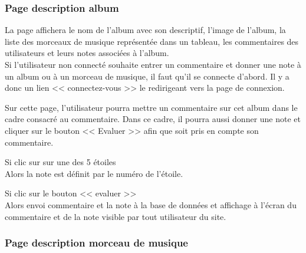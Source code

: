         \clearpage

		\subsubsection{Page description album}

			\begin{paragraphe}
				La page affichera le nom de l'album avec son descriptif, l'image de l'album, la liste des morceaux de musique
				 représentée dans un tableau, les commentaires des utilisateurs et leurs notes associées à l'album. \\
				Si l'utilisateur non connecté souhaite entrer un commentaire et donner une note à un album ou à un morceau de musique,
				 il faut qu'il se connecte d'abord. Il y a donc un lien << connectez-vous >> le redirigeant vers la page de connexion.
			\end{paragraphe}


			\begin{paragraphe}
				Sur cette page, l'utilisateur pourra mettre un commentaire sur cet album dans le cadre consacré au commentaire. Dans ce cadre, il pourra aussi donner une note et cliquer sur le bouton << Evaluer >> afin que soit pris en compte son commentaire.
			\end{paragraphe}

			\begin{paragraphe}
				Si clic sur sur une des 5 étoiles \\
				Alors la note est définit par le numéro de l'étoile.
			\end{paragraphe}

			\begin{paragraphe}
				Si clic sur le bouton << evaluer >> \\
				Alors envoi commentaire et la note à la base de données et affichage à l'écran du commentaire et de la note visible par tout utilisateur du site.
			\end{paragraphe}


	\clearpage

		\subsubsection{Page description morceau de musique}

